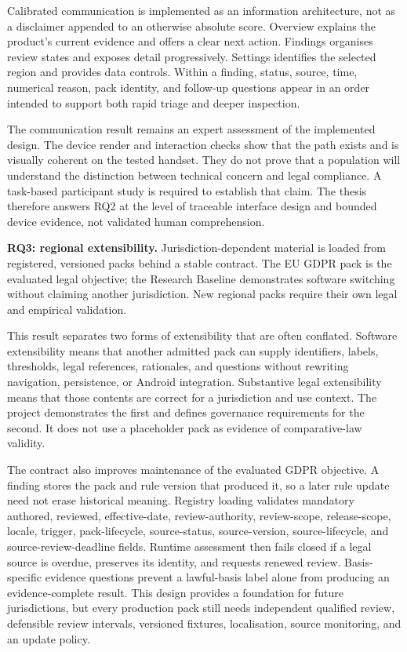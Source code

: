 Calibrated communication is implemented as an information architecture, not as a disclaimer appended to an otherwise absolute score. Overview explains the product's current evidence and offers a clear next action. Findings organises review states and exposes detail progressively. Settings identifies the selected region and provides data controls. Within a finding, status, source, time, numerical reason, pack identity, and follow-up questions appear in an order intended to support both rapid triage and deeper inspection.

The communication result remains an expert assessment of the implemented design. The device render and interaction checks show that the path exists and is visually coherent on the tested handset. They do not prove that a population will understand the distinction between technical concern and legal compliance. A task-based participant study is required to establish that claim. The thesis therefore answers RQ2 at the level of traceable interface design and bounded device evidence, not validated human comprehension.

\textbf{RQ3: regional extensibility.} Jurisdiction-dependent material is loaded from registered, versioned packs behind a stable contract. The EU GDPR pack is the evaluated legal objective; the Research Baseline demonstrates software switching without claiming another jurisdiction. New regional packs require their own legal and empirical validation.

This result separates two forms of extensibility that are often conflated. Software extensibility means that another admitted pack can supply identifiers, labels, thresholds, legal references, rationales, and questions without rewriting navigation, persistence, or Android integration. Substantive legal extensibility means that those contents are correct for a jurisdiction and use context. The project demonstrates the first and defines governance requirements for the second. It does not use a placeholder pack as evidence of comparative-law validity.

The contract also improves maintenance of the evaluated GDPR objective. A finding stores the pack and rule version that produced it, so a later rule update need not erase historical meaning. Registry loading validates mandatory authored, reviewed, effective-date, review-authority, review-scope, release-scope, locale, trigger, pack-lifecycle, source-status, source-version, source-lifecycle, and source-review-deadline fields. Runtime assessment then fails closed if a legal source is overdue, preserves its identity, and requests renewed review. Basis-specific evidence questions prevent a lawful-basis label alone from producing an evidence-complete result. This design provides a foundation for future jurisdictions, but every production pack still needs independent qualified review, defensible review intervals, versioned fixtures, localisation, source monitoring, and an update policy.

